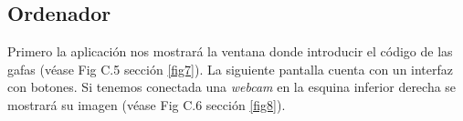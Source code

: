 \subsection{Ordenador}
Primero la aplicación nos mostrará la ventana donde introducir el código de las gafas (véase Fig C.5 sección \ref{fig7}).
\label{fig7}
La siguiente pantalla cuenta con un interfaz con botones. Si tenemos conectada una \textit{webcam} en la esquina inferior derecha se mostrará su imagen (véase Fig C.6 sección \ref{fig8}). 
\label{fig8}

